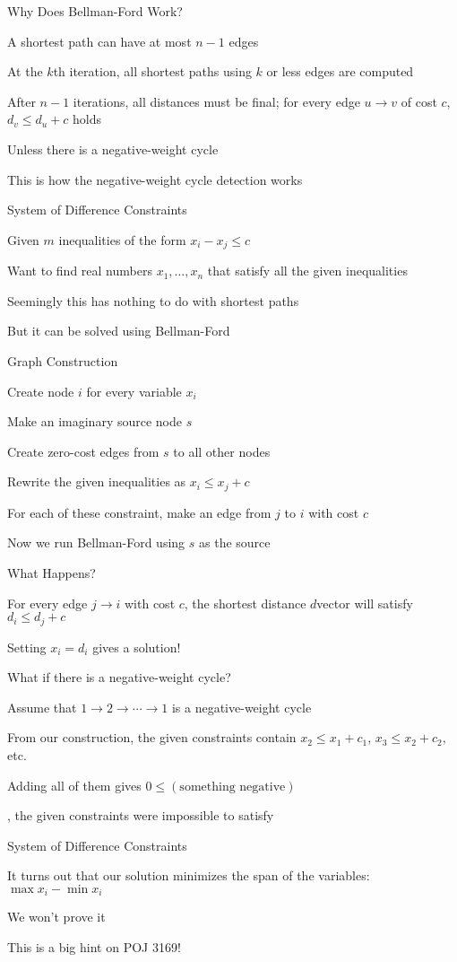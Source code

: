 \documentclass[13pt,onlymath]{beamer}
\begin{document}
\begin{frame}{Why Does Bellman-Ford Work?}
\BIT
\item A shortest path can have at most $n-1$ edges
\item At the $k$th iteration, all shortest paths using $k$ or less edges are computed
\item After $n-1$ iterations, all distances must be final; for every edge $u\rightarrow v$ of cost $c$, $d_v \le d_u+c$ holds
\BIT
\item Unless there is a negative-weight cycle
\item This is how the negative-weight cycle detection works
\EIT \EIT
\end{frame}

\begin{frame}{System of Difference Constraints}
\BIT
\item Given $m$ inequalities of the form $x_i - x_j \le c$
\item Want to find real numbers $x_1, \ldots, x_n$ that satisfy all the given inequalities
\vfill
\item Seemingly this has nothing to do with shortest paths
\BIT
\item But it can be solved using Bellman-Ford
\EIT \EIT
\end{frame}

\begin{frame}{Graph Construction}
\BIT
\item Create node $i$ for every variable $x_i$
\item Make an imaginary source node $s$
\item Create zero-cost edges from $s$ to all other nodes
\item Rewrite the given inequalities as $x_i \le x_j + c$
\BIT
\item For each of these constraint, make an edge from $j$ to $i$ with cost $c$
\EIT
\vfill
\item Now we run Bellman-Ford using $s$ as the source
\EIT
\end{frame}

\begin{frame}{What Happens?}
\BIT
\item For every edge $j\rightarrow i$ with cost $c$, the shortest distance $d$vector will satisfy $d_i \le d_j + c$
\BIT
\item Setting $x_i = d_i$ gives a solution!
\EIT
\item What if there is a negative-weight cycle?
\BIT
\item Assume that $1 \rightarrow 2 \rightarrow \cdots \rightarrow 1$ is a negative-weight cycle
\item From our construction, the given constraints contain $x_2 \le x_1 + c_1$, $x_3 \le x_2 + c_2$, etc.
\item Adding all of them gives $0 \le (\mbox{something negative})$
\item \ie, the given constraints were impossible to satisfy
\EIT \EIT
\end{frame}

\begin{frame}{System of Difference Constraints}
\BIT
\item It turns out that our solution minimizes the span of the variables: $\max x_i - \min x_i$
\item We won't prove it
\item This is a big hint on POJ 3169!
\EIT
\end{frame}
\end{document}
